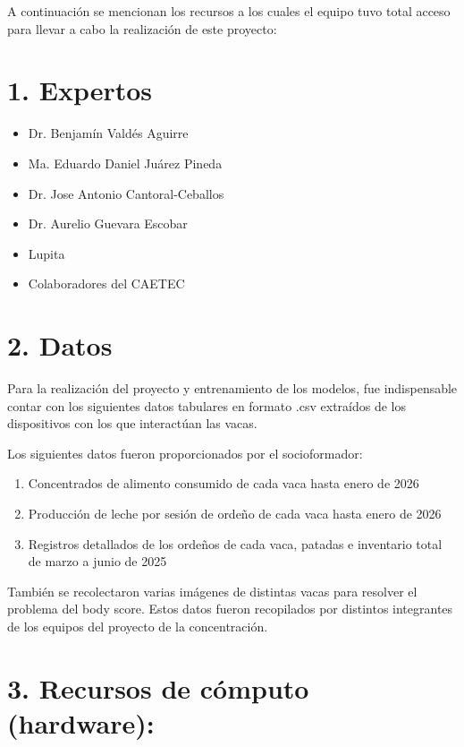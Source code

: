 \documentclass[11pt,letterpaper,DIV=12]{scrartcl}
\begin{document}


A continuación se mencionan los recursos a los cuales el equipo tuvo total acceso para llevar a cabo la realización de este proyecto:

\section{1. Expertos}

\begin{itemize}
  \item Dr. Benjamín Valdés Aguirre
  \item Ma. Eduardo Daniel Juárez Pineda
  \item Dr. Jose Antonio Cantoral-Ceballos
  \item Dr. Aurelio Guevara Escobar
  \item Lupita
  \item Colaboradores del CAETEC
\end{itemize}

\section{2. Datos}

Para la realización del proyecto y entrenamiento de los modelos, fue indispensable contar con los siguientes datos tabulares en formato .csv extraídos de los dispositivos con los que interactúan las vacas.

Los siguientes datos fueron proporcionados por el socioformador:

\begin{enumerate}
  \item Concentrados de alimento consumido de cada vaca hasta enero de 2026
  \item Producción de leche por sesión de ordeño de cada vaca hasta enero de 2026
  \item Registros detallados de los ordeños de cada vaca, patadas e inventario total de marzo a junio de 2025
\end{enumerate}

También se recolectaron varias imágenes de distintas vacas para resolver el problema del body score. Estos datos fueron recopilados por distintos integrantes de los equipos del proyecto de la concentración.

\section{3. Recursos de cómputo (hardware):}
\end{document}
